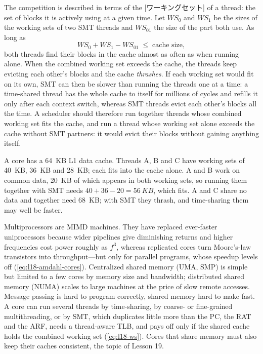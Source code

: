 \documentclass[../main.tex]{subfiles}
\begin{document}
The competition is described in terms of the
[ワーキングセット] of a thread: the set of blocks it is actively using
at a given time.  Let $\mathit{WS}_0$ and $\mathit{WS}_1$ be the sizes of
the working sets of two SMT threads and $\mathit{WS}_{01}$ the size of the
part both use.  As long as
\begin{equation}
  \mathit{WS}_0 + \mathit{WS}_1 - \mathit{WS}_{01} \;\le\; \text{cache size},
  \label{eq:l18-ws}
\end{equation}
both threads find their blocks in the cache almost as often as when running
alone.  When the combined working set exceeds the cache, the threads keep
evicting each other's blocks and the cache \emph{thrashes}.  If each working
set would fit on its own, SMT can then be slower than running the threads
one at a time: a time-shared thread has the whole cache to itself for
millions of cycles and refills it only after each context switch, whereas
SMT threads evict each other's blocks all the time.  A scheduler should therefore run together threads whose
combined working set fits the cache, and run a thread whose working set
alone exceeds the cache without SMT partners: it would evict their blocks
without gaining anything itself.

\begin{example}
  A core has a \SI{64}{KB} L1 data cache.  Threads A, B and C have working
  sets of \SI{40}{KB}, \SI{36}{KB} and \SI{28}{KB}; each fits into the cache
  alone.  A and B work on common data, \SI{20}{KB} of which appears in both
  working sets, so running them together with SMT needs
  $40+36-20=\SI{56}{KB}$, which fits.  A and C share no data and together
  need \SI{68}{KB}; with SMT they thrash, and time-sharing them may well be
  faster.
\end{example}

\begin{keypoint}
  Multiprocessors are MIMD machines.  They have replaced ever-faster
  uniprocessors because wider pipelines give diminishing returns and higher
  frequencies cost power roughly as $f^{3}$, whereas replicated cores turn
  Moore's-law transistors into throughput---but only for parallel programs,
  whose speedup levels off (\cref{eq:l18-amdahl-cores}).  Centralized shared
  memory (UMA, SMP) is simple but limited to a few cores by memory size and
  bandwidth; distributed shared memory (NUMA) scales to large machines at the price
  of slow remote accesses.  Message passing is hard to program correctly,
  shared memory hard to make fast.  A core can run several threads by
  time-sharing, by coarse- or fine-grained multithreading, or by SMT, which
  duplicates little more than the PC, the RAT and the ARF, needs a
  thread-aware TLB, and pays off only if the shared cache holds the combined
  working set (\cref{eq:l18-ws}).  Cores that share memory must also keep
  their caches consistent, the topic of Lesson 19.
\end{keypoint}
\end{document}
